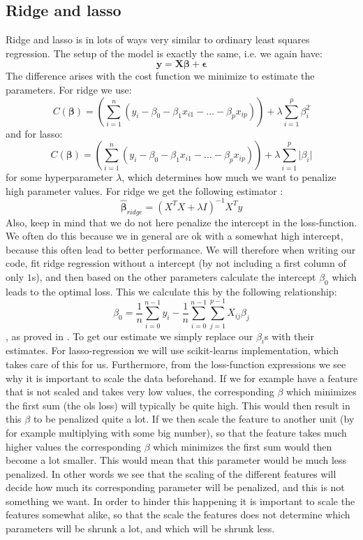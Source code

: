 \documentclass{article}
\begin{document}
\subsection{Ridge and lasso}
\label{ridge-lasso-model-sec}
Ridge and lasso is in lots of ways very similar to ordinary least squares
regression. The setup of the model is exactly the same, i.e. we again have:
$$\mathbf{y} = \mathbf{X} \bm{\beta} + \bm{\epsilon}$$
The difference arises with the cost function we minimize to estimate the parameters. For ridge we use:
$$C(\bm{\beta}) = \left(\sum_{i=1}^{n} (y_i - \beta_0 - \beta_1 x_{i 1} - \dots - \beta_{p} x_{i p})\right) + \lambda \sum_{i=1}^p \beta_i^2$$
and for lasso:
$$C(\bm{\beta}) = \left(\sum_{i=1}^{n} (y_i - \beta_0 - \beta_1 x_{i 1} - \dots - \beta_{p} x_{i p})\right) + \lambda \sum_{i=1}^p \lvert \beta_i \rvert$$
for some hyperparameter $\lambda$, which determines how much we want to penalize
high parameter values. For ridge we get the following estimator \cite[s.~3.4]{hastie2009elements}:
$$\hat{\bm{\beta}}_{ridge} = (X^T X + \lambda I)^{-1} X^T y$$
Also, keep in mind that we do not here penalize the intercept
in the loss-function. We often do this because we in general are ok with a
somewhat high intercept, because this often lead to better performance. We will
therefore when writing our code, fit ridge regression without a intercept (by
not including a first column of only $1$s), and then based on the other
parameters calculate the intercept $\beta_0$ which leads to the optimal
loss. This we calculate this by the following relationship:
$$\beta_0 = \frac{1}{n} \sum_{i=0}^{n-1} y_i - \frac{1}{n} \sum_{i=0}^{n-1} \sum_{j=1}^{p-1} X_{i j} \beta_j$$
, as proved in \cite[s.~Further manipulations]{week35notes}. To get our
estimate we simply replace our $\beta_i$s with their estimates. For
lasso-regression we will use scikit-learns implementation, which takes care of
this for us. Furthermore, from the loss-function expressions we see why it is
important to scale the data beforehand. If we for example have a feature that is
not scaled and takes very low values, the corresponding $\beta$ which
minimizes the first sum (the ols loss) will typically be quite high. This would
then result in this $\beta$ to be penalized quite a lot. If we then scale the
feature to another unit (by for example multiplying with some big number), so
that the feature takes much higher values the corresponding $\beta$ which
minimizes the first sum would then become a lot smaller. This would mean that
this parameter would be much less penalized. In other words we see that the
scaling of the different features will decide how much its corresponding
parameter will be penalized, and this is not something we want. In order to
hinder this happening it is important to scale the features somewhat alike, so
that the scale the features does not determine which parameters will be shrunk
a lot, and which will be shrunk less.
\end{document}
